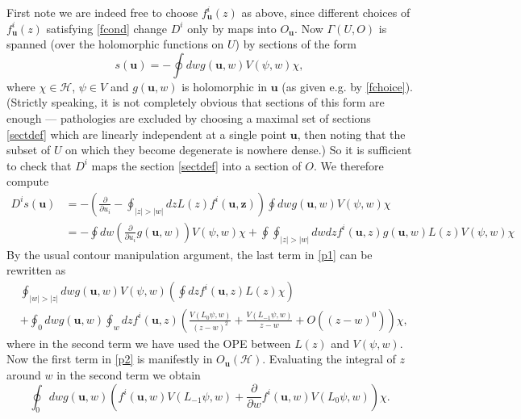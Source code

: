 \documentclass[a4paper,12pt]{article}
\newcommand{\uu}{{\mathbf u}}
\newcommand{\zz}{{\mathbf z}}
\newcommand{\F}{{\mathcal H}}
\newcommand{\abs}[1]{\lvert#1\rvert}
\newcommand{\dwrt}[1]{\frac{\partial}{\partial#1}}
\newcommand{\ci}{\oint}
\newcommand{\oproof}[1]{\noindent {\bf Proof#1.\ }}
\begin{document}
\medskip

\oproof{ of 1} First note we are indeed free to choose $f^i_\uu(z)$ as above, since different choices of $f^i_\uu(z)$
satisfying \eqref{fcond} change $D^i$ only by maps into $O_\uu$.
Now $\Gamma(U,O)$ is spanned (over the holomorphic functions on $U$) by sections of the form
\begin{equation} \label{sectdef}
s(\uu) = - \ci dw g(\uu,w) V(\psi,w) \chi,
\end{equation}
where $\chi \in \F$, $\psi \in V$ and $g(\uu, w)$ is holomorphic in $\uu$
(as given e.g. by \eqref{fchoice}).  (Strictly speaking, it is not completely obvious that sections of this form are enough ---
pathologies are excluded by choosing a maximal set
of sections \eqref{sectdef} which are linearly independent at a single point $\uu$, then noting that the subset of $U$ 
on which they become degenerate is nowhere dense.)
So it is sufficient to check that $D^i$ maps the section \eqref{sectdef} into a section of $O$.  We therefore compute 
\begin{equation} \label{p1}
\begin{split}
D^is(\uu) &= - \left(\dwrt{u_i} - \oint_{\abs{z} > \abs{w}} dz L(z) f^i(\uu, \zz) \right) \ci dw g(\uu, w) V(\psi, w) \chi \\
          &= - \ci dw \left(\dwrt{u_i} g(\uu,w) \right) V(\psi,w) \chi + \ci \ci_{\abs{z} > \abs{w}} dw dz f^i(\uu, z) g(\uu, w) L(z) V(\psi, w) \chi
\end{split}
\end{equation}
By the usual contour manipulation argument, the last term in \eqref{p1} can be rewritten as
\begin{equation} \label{p2} 
\begin{split}
& \ci_{\abs{w} > \abs{z}} dw g(\uu,w) V(\psi,w) \left(\ci dz f^i(\uu,z) L(z) \chi\right) \\
& + \ci_0 dw g(\uu,w) \ci_w dz f^i(\uu,z) \left(\frac{V(L_0 \psi, w)}{(z-w)^2} + \frac{V(L_{-1}\psi, w)}{z-w} + O((z-w)^0) \right) \chi,
\end{split}
\end{equation}
where in the second term we have used the OPE between $L(z)$ and $V(\psi, w)$.  Now the first term in \eqref{p2} is manifestly in $O_\uu(\F)$.  
Evaluating the integral of $z$ around $w$ in the second term we obtain
\begin{equation} \label{p3}
\ci_0 dw g(\uu,w) \left(f^i(\uu,w) V(L_{-1}\psi, w) + \dwrt{w} f^i(\uu,w) V(L_0 \psi, w) \right) \chi.
\end{equation}
\end{document}
